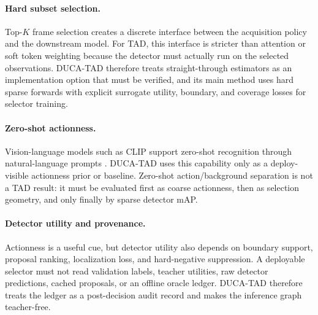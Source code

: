 \paragraph{Hard subset selection.}
Top-$K$ frame selection creates a discrete interface between the acquisition policy and the downstream model. For TAD, this interface is stricter than attention or soft token weighting because the detector must actually run on the selected observations. DUCA-TAD therefore treats straight-through estimators as an implementation option that must be verified, and its main method uses hard sparse forwards with explicit surrogate utility, boundary, and coverage losses for selector training.

\paragraph{Zero-shot actionness.}
Vision-language models such as CLIP support zero-shot recognition through natural-language prompts \citep{radford2021learning}. DUCA-TAD uses this capability only as a deploy-visible actionness prior or baseline. Zero-shot action/background separation is not a TAD result: it must be evaluated first as coarse actionness, then as selection geometry, and only finally by sparse detector mAP.

\paragraph{Detector utility and provenance.}
Actionness is a useful cue, but detector utility also depends on boundary support, proposal ranking, localization loss, and hard-negative suppression. A deployable selector must not read validation labels, teacher utilities, raw detector predictions, cached proposals, or an offline oracle ledger. DUCA-TAD therefore treats the ledger as a post-decision audit record and makes the inference graph teacher-free.
